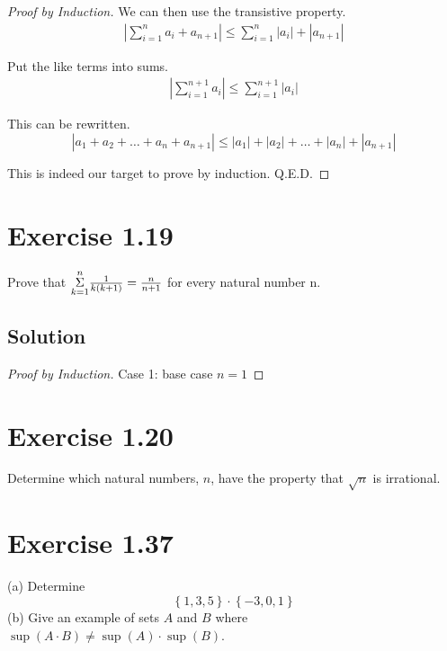 \documentclass[12pt]{report}
\begin{document}
\begin{proof}[Proof by Induction]
    We can then use the transistive property.
    \begin{gather}
        \left|\sum_{i = 1}^{n} a_i + a_{n + 1} \right| \leq \sum_{i = 1}^{n} \left| a_i \right| + \left| a_{n + 1} \right|
    \end{gather}

    Put the like terms into sums.
    \begin{gather}
        \left|\sum_{i = 1}^{n + 1} a_i \right| \leq \sum_{i = 1}^{n + 1} \left| a_i \right|
    \end{gather}

    This can be rewritten.
    \begin{equation}
        \left| a_1 + a_2 + \dots + a_n + a_{n + 1} \right| \le \left|a_1\right| + \left|a_2\right| + \dots + \left|a_n\right| + \left|a_{n + 1}\right|
    \end{equation}

    This is indeed our target to prove by induction.
    Q.E.D.
\end{proof}

\pagebreak
\section{Exercise 1.19}
Prove that $\overunderset{n}{k = 1}{\Sigma}\frac{1}{k(k + 1)} = \frac{n}{n + 1}$ for every natural number n. 

\subsection*{Solution}
\begin{proof}[Proof by Induction]
    Case 1: base case $n = 1$
\end{proof}

\pagebreak
\section{Exercise 1.20}
Determine which natural numbers, $n$, have the  property that $\sqrt{n}$ is irrational. 

\pagebreak
\section{Exercise 1.37}
(a) Determine
\[ \left\{1,3,5\right\} \cdot \left\{-3,0,1\right\} \]
(b) Give an example of sets $A$ and $B$ where $\sup(A\cdot B) \ne \sup(A) \cdot \sup(B)$.
\end{document}
